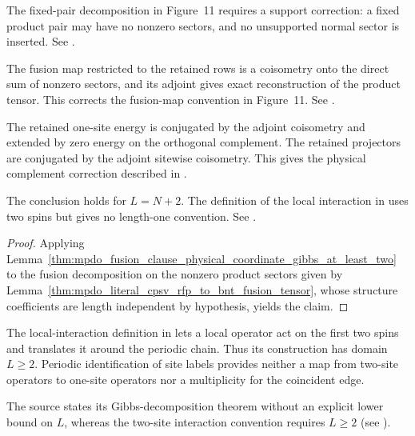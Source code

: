 \begin{theorem}
    The fixed-pair decomposition in Figure~11 requires a support correction:
    a fixed product pair may have no nonzero sectors, and no unsupported
    normal sector is inserted. See
    \cite{gap:cpsv16_figure11_per_pair_support}.

    The fusion map restricted to the retained rows is a coisometry onto the
    direct sum of nonzero sectors, and its adjoint gives exact reconstruction
    of the product tensor. This corrects the fusion-map convention in
    Figure~11. See
    \cite{gap:cpsv16_figure11_fusion_coisometry}.

    The retained one-site energy is conjugated by the adjoint
    coisometry and extended by zero energy on the orthogonal complement.
    The retained projectors are conjugated by the adjoint sitewise
    coisometry. This gives the physical complement correction described in
    \cite{gap:cpsv16_topological_gibbs_physical_complement}.

    The conclusion holds for $L=N+2$. The definition of the local interaction
    in \cite{Cirac2016MPDO_arXiv} uses two spins but gives no length-one
    convention. See
    \cite{gap:cpsv16_topological_gibbs_length_one}.
\end{theorem}
\begin{proof}\leanok
    Applying
    Lemma~\ref{thm:mpdo_fusion_clause_physical_coordinate_gibbs_at_least_two}
    to the fusion decomposition on the nonzero product sectors given by
    Lemma~\ref{thm:mpdo_literal_cpsv_rfp_to_bnt_fusion_tensor}, whose
    structure coefficients are length independent by hypothesis, yields the
    claim.
\end{proof}

\begin{remark}%
    \label{rem:mpdo_topological_gibbs_length_one_boundary}
    The local-interaction definition in \cite{Cirac2016MPDO_arXiv} lets a
    local operator act on the first two spins and translates it around the
    periodic chain. Thus its construction has domain $L\geq2$. Periodic
    identification of site labels provides neither a map from two-site
    operators to one-site operators nor a multiplicity for the coincident
    edge.

    The source states its Gibbs-decomposition theorem without an explicit
    lower bound on $L$, whereas the two-site interaction convention requires
    $L\geq2$ (see \cite{gap:cpsv16_topological_gibbs_length_one}).
\end{remark}
